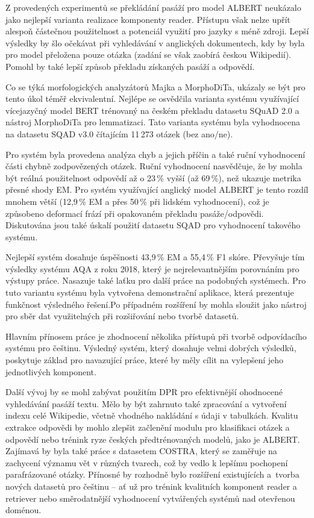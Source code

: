 Z provedených experimentů se překládání pasáží pro model ALBERT neukázalo jako nejlepší varianta realizace komponenty reader. Přístupu však nelze upřít alespoň částečnou použitelnost a potenciál využití pro jazyky s méně zdroji. Lepší výsledky by šlo očekávat při vyhledávání v anglických dokumentech, kdy by byla pro model přeložena pouze otázka (zadání se však zaobírá českou Wikipedií). Pomohl by také lepší způsob překladu získaných pasáží a odpovědí.\par
Co se týká morfologických analyzátorů Majka a MorphoDiTa, ukázaly se být pro tento úkol téměř ekvivalentní. Nejlépe se osvědčila varianta systému využívající vícejazyčný model BERT trénovaný na českém překladu datasetu SQuAD 2.0 a nástroj MorphoDiTa pro lemmatizaci. Tato varianta systému byla vyhodnocena na datasetu SQAD v3.0 čítajícím 11\,273 otázek (bez ano/ne).\par
Pro systém byla provedena analýza chyb a jejich příčin a také ruční vyhodnocení části chybně zodpovězených otázek. Ruční vyhodnocení nasvědčuje, že by mohla být reálná použitelnost odpovědí až o 23\,\% vyšší (až 69\,\%), než ukazuje metrika přesné shody EM. Pro systém využívající anglický model ALBERT je tento rozdíl mnohem větší (12,9\,\% EM a přes 50\,\% při lidském vyhodnocení), což je způsobeno deformací frází při opakovaném překladu pasáže/odpovědi. Diskutována jsou také úskalí použití datasetu SQAD pro vyhodnocení takového systému.\par

Nejlepší systém dosahuje úspěšnosti 43,9\,\% EM a 55,4\,\% F1 skóre. Převyšuje tím výsledky systému AQA z roku 2018, který je nejrelevantnějším porovnáním pro výstupy práce. Nasazuje také laťku pro další práce na podobných systémech. Pro tuto variantu systému byla vytvořena demonstrační aplikace, která prezentuje funkčnost výsledného řešení.\linebreak Po případném rozšíření by mohla sloužit jako nástroj pro sběr dat využitelných při rozšiřování nebo tvorbě datasetů.\par

Hlavním přínosem práce je zhodnocení několika přístupů při tvorbě odpovídacího systému pro češtinu. Výsledný systém, který dosahuje velmi dobrých výsledků, poskytuje základ pro navazující práce, které by měly cílit na vylepšení jeho jednotlivých komponent.\par
\smallskip
Další vývoj by se mohl zabývat použitím DPR pro efektivnější ohodnocené vyhledávání pasáží textu. Mělo by být zahrnuto také zpracování a vytvoření indexu celé Wikipedie, včetně vhodného nakládání s údaji v tabulkách. Kvalitu extrakce odpovědi by mohlo zlepšit začlenění modulu pro klasifikaci otázek a odpovědí nebo trénink ryze českých předtrénovaných modelů, jako je ALBERT. Zajímavá by byla také práce s datasetem COSTRA, který se zaměřuje na zachycení významu vět v různých tvarech, což by vedlo k lepšímu pochopení parafrázované otázky. Přínosné by rozhodně bylo rozšíření existujících a~tvorba nových datasetů pro češtinu -- ať už pro trénink kvalitních komponent reader a retriever nebo směrodatnější vyhodnocení vytvářených systémů nad otevřenou doménou.
